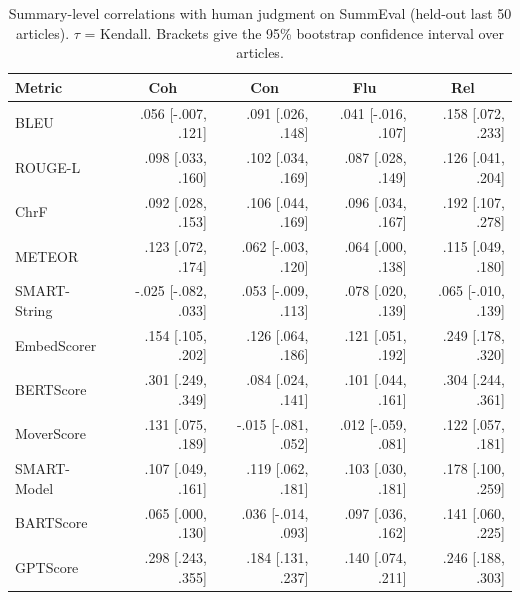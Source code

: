 \begin{table}[t]
\centering
\caption{Summary-level correlations with human judgment on SummEval (held-out last 50 articles). $\tau$ = Kendall. Brackets give the 95\% bootstrap confidence interval over articles.}
\label{tab:correlations_summary_kendall}
\small
\linespread{1}\selectfont
\setlength{\tabcolsep}{4pt}
\begin{tabular}{@{}lrrrr@{}}
\toprule
Metric & \multicolumn{1}{c}{Coh} & \multicolumn{1}{c}{Con} & \multicolumn{1}{c}{Flu} & \multicolumn{1}{c}{Rel} \\
\midrule
BLEU & .056 {\scriptsize [-.007, .121]} & .091 {\scriptsize [.026, .148]} & .041 {\scriptsize [-.016, .107]} & .158 {\scriptsize [.072, .233]} \\
ROUGE-L & .098 {\scriptsize [.033, .160]} & .102 {\scriptsize [.034, .169]} & .087 {\scriptsize [.028, .149]} & .126 {\scriptsize [.041, .204]} \\
ChrF & .092 {\scriptsize [.028, .153]} & .106 {\scriptsize [.044, .169]} & .096 {\scriptsize [.034, .167]} & .192 {\scriptsize [.107, .278]} \\
METEOR & .123 {\scriptsize [.072, .174]} & .062 {\scriptsize [-.003, .120]} & .064 {\scriptsize [.000, .138]} & .115 {\scriptsize [.049, .180]} \\
SMART-String & -.025 {\scriptsize [-.082, .033]} & .053 {\scriptsize [-.009, .113]} & .078 {\scriptsize [.020, .139]} & .065 {\scriptsize [-.010, .139]} \\
EmbedScorer & .154 {\scriptsize [.105, .202]} & .126 {\scriptsize [.064, .186]} & .121 {\scriptsize [.051, .192]} & .249 {\scriptsize [.178, .320]} \\
BERTScore & .301 {\scriptsize [.249, .349]} & .084 {\scriptsize [.024, .141]} & .101 {\scriptsize [.044, .161]} & .304 {\scriptsize [.244, .361]} \\
MoverScore & .131 {\scriptsize [.075, .189]} & -.015 {\scriptsize [-.081, .052]} & .012 {\scriptsize [-.059, .081]} & .122 {\scriptsize [.057, .181]} \\
SMART-Model & .107 {\scriptsize [.049, .161]} & .119 {\scriptsize [.062, .181]} & .103 {\scriptsize [.030, .181]} & .178 {\scriptsize [.100, .259]} \\
BARTScore & .065 {\scriptsize [.000, .130]} & .036 {\scriptsize [-.014, .093]} & .097 {\scriptsize [.036, .162]} & .141 {\scriptsize [.060, .225]} \\
GPTScore & .298 {\scriptsize [.243, .355]} & .184 {\scriptsize [.131, .237]} & .140 {\scriptsize [.074, .211]} & .246 {\scriptsize [.188, .303]} \\

\end{tabular}
\end{table}
